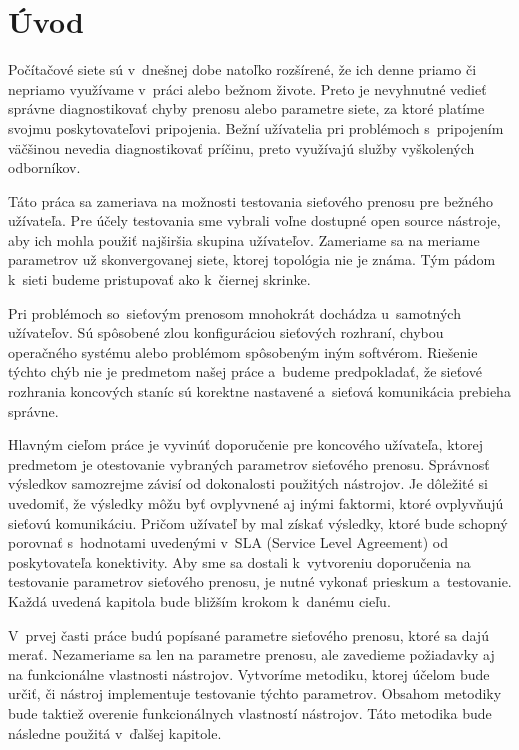 
\chapter{Úvod} \label{uvod}
Počítačové siete sú v~dnešnej dobe natoľko rozšírené, že
ich denne priamo či nepriamo využívame v~práci alebo bežnom živote.
Preto je nevyhnutné vedieť správne diagnostikovať chyby prenosu
alebo parametre siete, za ktoré platíme svojmu poskytovateľovi pripojenia.
Bežní užívatelia pri problémoch s~pripojením  väčšinou nevedia diagnostikovať 
príčinu, preto využívajú služby vyškolených odborníkov.


Táto práca sa zameriava na možnosti testovania sieťového prenosu pre bežného
užívateľa. Pre účely testovania sme vybrali voľne dostupné open source
nástroje, aby ich mohla použiť najširšia skupina užívateľov. Zameriame sa
na meriame parametrov už skonvergovanej siete, ktorej topológia nie je známa. Tým
pádom k~sieti budeme pristupovať ako k~čiernej skrinke. 

Pri problémoch so~sieťovým prenosom mnohokrát dochádza u~samotných užívateľov. 
Sú spôsobené zlou
konfiguráciou sieťových rozhraní, chybou operačného systému alebo problémom 
spôsobeným iným softvérom. Riešenie týchto chýb nie je predmetom našej práce
a~budeme predpokladať, že sieťové rozhrania koncových staníc
sú korektne nastavené a~sieťová komunikácia prebieha správne.

Hlavným cieľom práce je vyvinúť doporučenie pre koncového užívateľa, ktorej
predmetom je otestovanie vybraných parametrov sieťového prenosu. Správnosť
výsledkov samozrejme závisí od dokonalosti použitých nástrojov. Je dôležité si uvedomiť,
že výsledky môžu byť ovplyvnené aj inými faktormi, ktoré ovplyvňujú sieťovú 
komunikáciu. Pričom užívateľ by mal získať výsledky, ktoré bude schopný porovnať s~hodnotami
uvedenými v~SLA (Service Level Agreement) od poskytovateľa konektivity. Aby sme sa dostali
k~vytvoreniu doporučenia na testovanie parametrov sieťového prenosu,
je nutné vykonať prieskum a~testovanie. Každá uvedená kapitola bude 
bližším krokom k~danému cieľu.

V~prvej časti práce budú popísané parametre sieťového prenosu, ktoré sa 
dajú merať. Nezameriame sa len na parametre prenosu, ale zavedieme požiadavky aj na
funkcionálne vlastnosti nástrojov.
Vytvoríme metodiku, ktorej účelom bude určiť, či nástroj implementuje testovanie 
týchto parametrov. Obsahom metodiky bude taktiež overenie 
funkcionálnych vlastností nástrojov. Táto metodika bude následne použitá
v~ďalšej kapitole.


